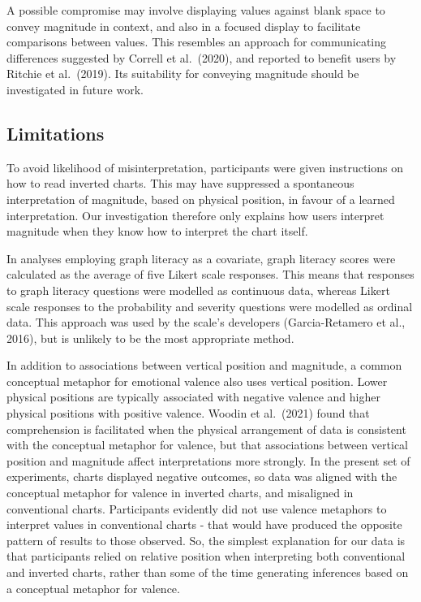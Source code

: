 \documentclass[journal]{vgtc}                %
\begin{document}
A possible compromise may involve displaying values against blank space to convey magnitude in context, and also in a focused display to facilitate comparisons between values. This resembles an approach for communicating differences suggested by Correll et al.~(2020), and reported to benefit users by Ritchie et al.~(2019). Its suitability for conveying magnitude should be investigated in future work.

\hypertarget{limitations}{%
\subsection{Limitations}\label{limitations}}

To avoid likelihood of misinterpretation, participants were given instructions on how to read inverted charts. This may have suppressed a spontaneous interpretation of magnitude, based on physical position, in favour of a learned interpretation. Our investigation therefore only explains how users interpret magnitude when they know how to interpret the chart itself.~

In analyses employing graph literacy as a covariate, graph literacy scores were calculated as the average of five Likert scale responses. This means that responses to graph literacy questions were modelled as continuous data, whereas Likert scale responses to the probability and severity questions were modelled as ordinal data. This approach was used by the scale's developers (Garcia-Retamero et al., 2016), but is unlikely to be the most appropriate method.

In addition to associations between vertical position and magnitude, a common conceptual metaphor for emotional valence also uses vertical position. Lower physical positions are typically associated with negative valence and higher physical positions with positive valence. Woodin et al.~(2021) found that comprehension is facilitated when the physical arrangement of data is consistent with the conceptual metaphor for valence, but that associations between vertical position and magnitude affect interpretations more strongly. In the present set of experiments, charts displayed negative outcomes, so data was aligned with the conceptual metaphor for valence in inverted charts, and misaligned in conventional charts. Participants evidently did not use valence metaphors to interpret values in conventional charts - that would have produced the opposite pattern of results to those observed. So, the simplest explanation for our data is that participants relied on relative position when interpreting both conventional and inverted charts, rather than some of the time generating inferences based on a conceptual metaphor for valence.
\end{document}
